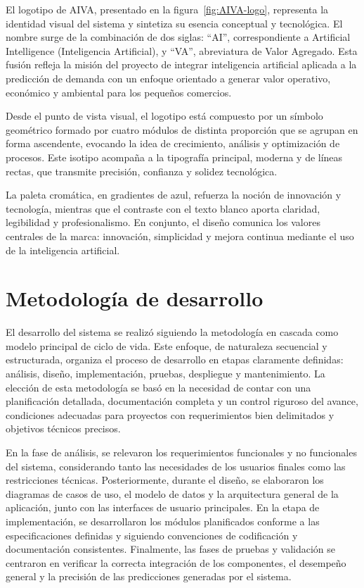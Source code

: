 El logotipo de AIVA, presentado en la figura~\ref{fig:AIVA-logo}, representa la identidad visual del sistema y sintetiza su esencia conceptual y tecnológica. El nombre surge de la combinación de dos siglas: “AI”, correspondiente a Artificial Intelligence (Inteligencia Artificial), y “VA”, abreviatura de Valor Agregado. Esta fusión refleja la misión del proyecto de integrar inteligencia artificial aplicada a la predicción de demanda con un enfoque orientado a generar valor operativo, económico y ambiental para los pequeños comercios.

Desde el punto de vista visual, el logotipo está compuesto por un símbolo geométrico formado por cuatro módulos de distinta proporción que se agrupan en forma ascendente, evocando la idea de crecimiento, análisis y optimización de procesos. Este isotipo acompaña a la tipografía principal, moderna y de líneas rectas, que transmite precisión, confianza y solidez tecnológica.

La paleta cromática, en gradientes de azul, refuerza la noción de innovación y tecnología, mientras que el contraste con el texto blanco aporta claridad, legibilidad y profesionalismo. En conjunto, el diseño comunica los valores centrales de la marca: innovación, simplicidad y mejora continua mediante el uso de la inteligencia artificial.


\section{Metodología de desarrollo}\label{sec:metodologia}

El desarrollo del sistema se realizó siguiendo la metodología en cascada como modelo principal de ciclo de vida. Este enfoque, de naturaleza secuencial y estructurada, organiza el proceso de desarrollo en etapas claramente definidas: análisis, diseño, implementación, pruebas, despliegue y mantenimiento. La elección de esta metodología se basó en la necesidad de contar con una planificación detallada, documentación completa y un control riguroso del avance, condiciones adecuadas para proyectos con requerimientos bien delimitados y objetivos técnicos precisos.

En la fase de análisis, se relevaron los requerimientos funcionales y no funcionales del sistema, considerando tanto las necesidades de los usuarios finales como las restricciones técnicas. Posteriormente, durante el diseño, se elaboraron los diagramas de casos de uso, el modelo de datos y la arquitectura general de la aplicación, junto con las interfaces de usuario principales. En la etapa de implementación, se desarrollaron los módulos planificados conforme a las especificaciones definidas y siguiendo convenciones de codificación y documentación consistentes. Finalmente, las fases de pruebas y validación se centraron en verificar la correcta integración de los componentes, el desempeño general y la precisión de las predicciones generadas por el sistema.


